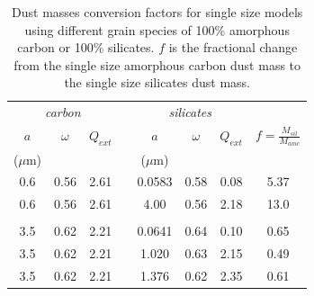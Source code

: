 \documentclass[useAMS,usenatbib,usegraphicx]{mnras}
\begin{document}
\begin{table}
	\caption{Dust masses conversion factors for single size models using different grain species of 100\% amorphous carbon or 100\% silicates. $f$ is the fractional change from the single size amorphous carbon dust mass to the single size silicates dust mass.}
	\label{tb_sil}
	\begin{center}
  	\begin{tabular}{@{} cccccccc @{}}
    	\hline
	\multicolumn{3}{c}{\textit{carbon}} && \multicolumn{3}{c}{\textit{silicates}} & \\
$a$ &$\omega$ &  $Q_{ext}$ & &$a$&$\omega$ & $Q_{ext}$ & $f=\frac{M_{sil}}{M_{amc}}$ \\
($\mu$m) &&&&($\mu$m)\\
\hline
0.6 & 0.56 & 2.61 & &0.0583 & 0.58 &0.08 & 5.37 \\
0.6 &0.56 & 2.61 & &4.00 & 0.56 & 2.18 & 13.0 \\
 \\
3.5 & 0.62 &2.21 & &0.0641 & 0.64 & 0.10 & 0.65 \\
3.5 & 0.62 &2.21 & &1.020 & 0.63 & 2.15 & 0.49 \\
3.5 & 0.62 & 2.21 & &1.376 & 0.62 & 2.35 & 0.61 \\


    \hline
  \end{tabular}
  \end{center}
\end{table}



\end{document}
